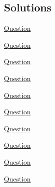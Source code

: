 \documentclass[../probability-notes.tex]{subfiles}
\begin{document}
    \subsection{Solutions}
    \begin{enumerate}
        \item \hypertarget{a_indcomp}{\hyperlink{q_indcomp}{Question}}
        

        \item \hypertarget{a_conind}{\hyperlink{q_conind}{Question}}
        

        \hypertarget{a_geomeet}{\item} \hyperlink{q_geomeet}{Question} \newline
        
    
        \hypertarget{a_expfn}{\item} \hyperlink{q_expfn}{Question}
        
    
        \hypertarget{a_cumuldistfn}{\item} \hyperlink{q_cumuldistfn}{Question} \newline
        
        
        \hypertarget{a_tossh}{\item} \hyperlink{q_tossh}{Question} \newline
        

        \hypertarget{a_itrexpproof}{\item} \hyperlink{q_itrexpproof}{Question} \newline
        

        \hypertarget{a_itrexpthree}{\item} \hyperlink{q_itrexpthree}{Question} \newline
        
    
        \hypertarget{a_itrexppractice}{\item} \hyperlink{q_itrexppractice}{Question}\newline
        
        
        \hypertarget{a_hatproblem}{\item} \hyperlink{q_hatproblem}{Question}\newline
        


\end{enumerate}
\end{document}
